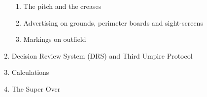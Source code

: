 \documentclass[12pt]{article}
\begin{document}
\begin{enumerate}
\vspace{\baselineskip}
\begin{enumerate}
	\item {\fontsize{9pt}{10.8pt}\selectfont The pitch and the creases\par}\par


\vspace{\baselineskip}
	\item {\fontsize{9pt}{10.8pt}\selectfont Advertising on grounds, perimeter boards and sight-screens\par}\par


\vspace{\baselineskip}
	\item {\fontsize{9pt}{10.8pt}\selectfont Markings on outfield\par}\par


\vspace{\baselineskip}

\end{enumerate}
	\item {\fontsize{9pt}{10.8pt}\selectfont Decision Review System (DRS) and Third Umpire Protocol\par}\par


\vspace{\baselineskip}
	\item {\fontsize{9pt}{10.8pt}\selectfont Calculations\par}\par


\vspace{\baselineskip}
	\item {\fontsize{9pt}{10.8pt}\selectfont The Super Over\par}
\end{enumerate}\par


\vspace{\baselineskip}

\vspace{\baselineskip}

\vspace{\baselineskip}

\vspace{\baselineskip}

\vspace{\baselineskip}

\vspace{\baselineskip}
\end{document}
